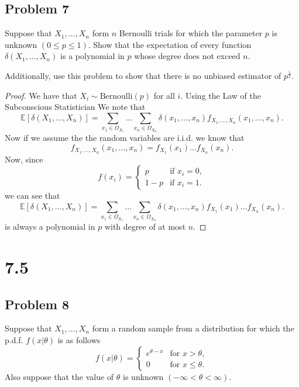 \documentclass{article}
\newcommand{\E}[1]{\mathbb{E}\left[#1\right]}
\newcommand{\randsamp}{X_1,\dots,X_n}
\begin{document}
\subsection*{Problem 7}
Suppose that $\randsamp$ form $n$ Bernoulli trials for which the parameter $p$
is unknown $(0 \leq p \leq 1)$. Show that the expectation of every function
$\delta(\randsamp)$ is a polynomial in $p$ whose degree does not exceed $n$.

Additionally, use this problem to show that there is no unbiased estimator
of $p^{\frac{1}{2}}$.

\begin{proof}
    We have that $X_i \sim \text{Bernoulli}(p)$ for all $i$. Using the
    Law of the Subconscious Statistician We note that
    \begin{equation*}
        \E{\delta(\randsamp)} =
        \sum_{x_1 \in \Omega_{X_1}}\dots \sum_{x_n \in \Omega_{X_n}}
        \delta(x_1,\dots,x_n)f_{X_1,\dots,X_n}(x_1,\dots,x_n).
    \end{equation*}
    Now if we assume the the random variables are i.i.d. we know that
    \begin{equation*}
        f_{X_1,\dots,X_n}(x_1,\dots,x_n) = f_{X_1}(x_1)\dots f_{X_n}(x_n).
    \end{equation*}
    Now, since
    \begin{equation*}
        f(x_i) = \begin{cases}
            p     & \text{if } x_i = 0, \\
            1 - p & \text{if } x_i = 1.
        \end{cases}
    \end{equation*}
    we can see that
    \begin{equation*}
        \E{\delta(\randsamp)} =
        \sum_{x_1 \in \Omega_{X_1}}\dots \sum_{x_n \in \Omega_{X_n}}
        \delta(x_1,\dots,x_n)f_{X_1}(x_1)\dots f_{X_n}(x_n).
    \end{equation*}
    is always a polynomial in $p$ with degree of at most $n$.
\end{proof}

\section*{7.5}
\subsection*{Problem 8}
Suppose that $\randsamp$ form a random sample from a distribution for which
the p.d.f. $f(x|\theta)$ is as follows
\begin{equation*}
    f(x|\theta) = \begin{cases}
        e^{\theta - x} & \text{for } x > \theta,    \\
        0              & \text{for } x \leq \theta.
    \end{cases}
\end{equation*}
Also suppose that the value of $\theta$ is unknown $(-\infty < \theta < \infty)$.
\end{document}
